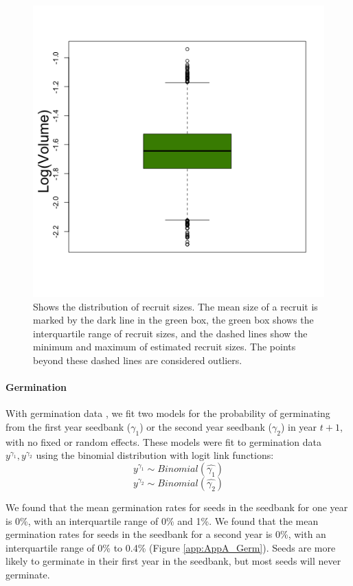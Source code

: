 \documentclass[11pt]{article}
\begin{document}
\begin{figure}
	\includegraphics[width=0.91\linewidth]{Figures/rec_size.png}
	\caption{Shows the distribution of recruit sizes. The mean  size of a recruit is marked by the dark line in the green box, the green box shows the interquartile range of recruit sizes, and the dashed lines show the minimum and maximum of estimated recruit sizes. The points beyond these dashed lines are considered outliers. }
	\label{app:AppA_Recruit_Dist}
\end{figure}

\paragraph{Germination}
With germination data \cite{Miller2007}, we fit two models for the probability of germinating from the first year seedbank ($\gamma_1$) or the second year seedbank ($\gamma_2$) in year $t+1$, with no fixed or random effects.
These models were fit to germination data $y^{\gamma_1}, y^{\gamma_2}$  using the binomial distribution with logit link functions:
$$y^{\gamma_1} \sim Binomial(\hat{\gamma_1})$$
$$y^{\gamma_2} \sim Binomial(\hat{\gamma_2})$$

We found that the mean germination rates for seeds in the seedbank for one year  is 0\%, with an interquartile range of 0\% and 1\%.
We found that the mean germination rates for seeds in the seedbank for a second year is 0\%, with an interquartile range of 0\% to 0.4\% (Figure \ref{app:AppA_Germ}).
Seeds are more likely to germinate in their first year in the seedbank, but most seeds will never germinate. 
\end{document}
